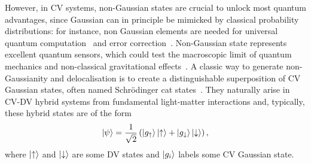 \documentclass[%
reprint,
superscriptaddress,
nofootinbib,
 amsmath,amssymb,
prx,
floatfix,
]{revtex4-2}
\begin{document}
\newpage However, in CV systems, non-Gaussian states are crucial to unlock most quantum advantages, since Gaussian can in principle be mimicked by classical probability distributions: for instance, non Gaussian elements are needed for universal quantum computation~\cite{lloyd_quantum_1999,Jeong_Effective_2002,Ralph_Quantum_2003,albarelli_resource_2018,Eriksson2024} and error correction~\cite{gottesman_encoding_2001,campagne-ibarcq_quantum_2020,dahan_creation_2023}. Non-Gaussian state represents excellent quantum sensors, which could test the macroscopic limit of quantum mechanics and non-classical gravitational effects~\cite{romero-isart_large_2011,roda_macroscopic_2024,bose_spin_2017,marletto_gravitationally-induced_2017}. A classic way to generate non-Gaussianity and delocalisation is to create a distinguishable superposition of CV Gaussian states, often named Schr\"odinger cat states~\cite{Shore_jaynes_1993}. They naturally arise in CV-DV hybrid systems from fundamental light-matter interactions and, typically, these hybrid states are of the form
\begin{equation}
    \ket{\psi}= \frac{1}{\sqrt{2}}\left( \ket{g_\uparrow} \ket{\uparrow} + \ket{g_\downarrow}\ket{\downarrow} \right) ,
\end{equation}
where $\ket{\uparrow}$ and $\ket{\downarrow}$ are some DV states and $\ket{g_i}$ labels some CV Gaussian state.
\end{document}
